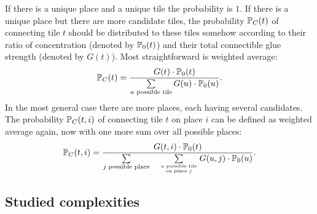 	\begin{note}\label{note:tilesystems}
		If there is a unique place and a unique tile the probability is $1$. If there is a unique place but there are more candidate tiles, the probability $\mathbb{P}_C(t)$ of connecting tile $t$ should be distributed to these tiles somehow according to their ratio of concentration (denoted by $\mathbb{P}_0(t)$) and their total connectible glue strength (denoted by $G(t)$). Most straightforward is weighted average:
		\begin{equation*}
			\mathbb{P}_C(t) = \frac{G(t)\cdot\mathbb{P}_0(t)}{\sum\limits_{u\textnormal{ possible tile}}G(u)\cdot\mathbb{P}_0(u)} .
		\end{equation*}
		In the most general case there are more places, each having several candidates. The probability $\mathbb{P}_C(t,i)$ of connecting tile $t$ on place $i$ can be defined as weighted average again, now with one more sum over all possible places:
		\begin{equation*}
			\mathbb{P}_C(t,i) = \frac{G(t,i)\cdot\mathbb{P}_0(t)}{\sum\limits_{j\textnormal{ possible place}}\quad\sum\limits_{u\textnormal{ possible tile}\atop\textnormal{on place }j}G(u,j)\cdot\mathbb{P}_0(u)} .
		\end{equation*}
	\end{note}


\subsection{Studied complexities}
	
